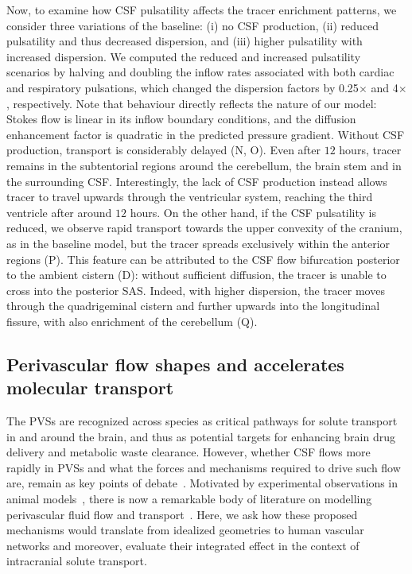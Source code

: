 \documentclass[fleqn,10pt]{wlscirep}
\begin{document}
Now, to examine how CSF pulsatility affects the tracer enrichment patterns,
we consider three variations of the baseline: (i) no CSF production,
(ii) reduced pulsatility and thus decreased dispersion, and (iii) higher pulsatility with increased dispersion. We computed the reduced and increased pulsatility scenarios by halving and doubling the inflow rates associated with both cardiac and respiratory pulsations, which changed the dispersion factors by 0.25$\times$ and 4$\times$, respectively. Note that behaviour directly reflects the nature of our model: Stokes flow is linear in its inflow boundary conditions, and the diffusion enhancement factor is quadratic in the predicted pressure gradient.
Without CSF production, transport is considerably delayed
(N, O). Even after $12$ hours, tracer remains in the
subtentorial regions around the cerebellum, the brain stem and in the
surrounding CSF. Interestingly, the lack of CSF production instead
allows tracer to travel upwards through the ventricular system,
reaching the third ventricle after around $12$ hours. On the other
hand, if the CSF pulsatility is reduced, we observe rapid transport
towards the upper convexity of the cranium, as in the baseline model,
but the tracer spreads exclusively within the anterior regions
(P). This feature can be attributed to the CSF flow
bifurcation posterior to the ambient cistern (D):
without sufficient diffusion, the tracer is unable to cross into the
posterior SAS. Indeed, with higher dispersion, the tracer moves
through the quadrigeminal cistern and further upwards into the
longitudinal fissure, with also enrichment of the cerebellum
(Q).

\subsection*{Perivascular flow shapes and accelerates molecular transport}
\label{sec:pvs_flow_results}

The PVSs are recognized across species as critical pathways for solute
transport in and around the brain, and thus as potential targets for
enhancing brain drug delivery and metabolic waste clearance. However,
whether CSF flows more rapidly in PVSs and what the forces and
mechanisms required to drive such flow are, remain as key points of
debate~\cite{bohr2022glymphatic, van2024caa}. Motivated by
experimental observations in animal
models~\cite{iliff2012paravascular, iliff2013cerebral, mestre2018flow,
  bedussi2018paravascular}, there is now a remarkable body of
literature on modelling perivascular fluid flow and
transport~\cite{bilston2003arterial, asgari2016glymphatic,
  rey2018pulsatile, daversin2020mechanisms, sharp2019dispersion,
  thomas2019fluid, kedarasetti2020functional, kedarasetti2020arterial,
  troyetsky2021dispersion, martinac2021phase, gjerde2023directional,
  nozaleda2024arterial}. Here, we ask how these proposed mechanisms
would translate from idealized geometries to human vascular networks
and moreover, evaluate their integrated effect in the context of
intracranial solute transport.
\end{document}
